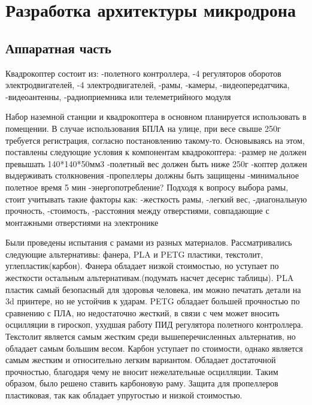 
\section{Разработка архитектуры микродрона}
\subsection{Аппаратная часть}

Квадрокоптер состоит из:
-полетного контроллера,
-4 регуляторов оборотов электродвигателей,
-4 электродвигателей,
-рамы,
-камеры,
-видеопередатчика,
-видеоантенны,
-радиоприемника или телеметрийного модуля

Набор наземной станции и квадрокоптера в основном планируется использовать в помещении. В случае использования БПЛА на улице, при весе свыше 250г требуется регистрация, согласно постановлению такому-то. Основываясь на этом, поставлены следующие условия к компонентам квадрокоптера:
-размер не должен превышать 140*140*50мм3
-полетный вес должен быть ниже 250г
-коптер должен выдерживать столкновения
-пропеллеры должны быть защищены
-минимальное полетное время 5 мин
-энергопотребление?
Подходя к вопросу выбора рамы, стоит учитывать такие факторы как:
-жесткость рамы,
-легкий вес,
-диагональную прочность,
-стоимость,
-расстояния между отверстиями, совпадающие с монтажными отверстиями на электронике

Были проведены испытания с рамами из разных материалов. Рассматривались следующие альтернативы: фанера, PLA и PETG пластики, текстолит, углепластик(карбон). Фанера обладает низкой стоимостью, но уступает по жесткости остальным альтернативам.(подумать насчет десернс таблицы). PLA пластик самый безопасный для здоровья человека, им можно печатать детали на 3d принтере, но не устойчив к ударам. PETG обладает большей прочностью по сравнению с ПЛА, но недостаточно жесткий, в связи с чем может вносить осцилляции в гироскоп, ухудшая работу ПИД регулятора полетного контроллера. Текстолит является самым жестким среди вышеперечисленных альтернатив, но обладает самым большим весом. Карбон уступает по стоимости, однако является самым жестким и относительно легким вариантом. Обладает достаточной прочностью, благодаря чему не вносит нежелательные осцилляции. Таким образом, было решено ставить карбоновую раму.
Защита для пропеллеров пластиковая, так как обладает упругостью и низкой стоимостью.

